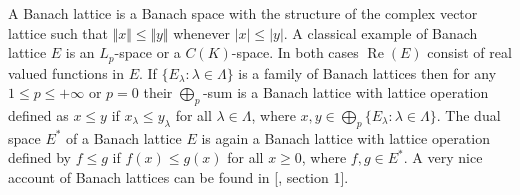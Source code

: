 A Banach lattice is a Banach space with the structure of the complex vector lattice such that $\Vert x\Vert\leq \Vert y\Vert$ whenever $|x|\leq |y|$. A classical example of Banach lattice $E$ is an $L_p$-space or a $C(K)$-space. In both cases $\operatorname{Re}(E)$ consist of real valued functions in $E$. If $\{E_\lambda:\lambda\in\Lambda\}$ is a family of Banach lattices then for any $1\leq p\leq +\infty$ or $p=0$ their $\bigoplus_p$-sum is a Banach lattice with lattice operation defined as $x\leq y$ if $x_\lambda\leq y_\lambda$ for all $\lambda\in\Lambda$, where $x,y\in\bigoplus_p\{ E_\lambda:\lambda\in\Lambda\}$. The dual space $E^*$ of a Banach lattice $E$ is again a Banach lattice with lattice operation defined by $f\leq g$ if $f(x)\leq g(x)$ for all $x\geq 0$, where $f,g\in  E^*$. A very nice account of Banach lattices can be found in [\cite{LaceyIsomThOfClassicBanSp}, section 1].


